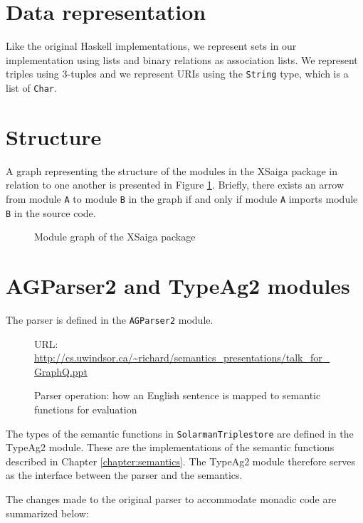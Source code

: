 \documentclass[../main.tex]{subfiles}
\begin{document}
\section{Data representation}

Like the original Haskell implementations, we represent sets in our implementation using lists and binary relations as association lists.  We represent triples using 3-tuples and we represent URIs using the \texttt{String} type, which is a list of \texttt{Char}.

\section{Structure}

A graph representing the structure of the modules in the XSaiga package in relation to one another is presented in Figure \ref{fig:modulegraph}.  Briefly, there exists an arrow from module \texttt{A} to module \texttt{B} in the graph if and only if module \texttt{A} imports module \texttt{B} in the source code.

\begin{figure}[h]
	\centering
	\caption{Module graph of the XSaiga package}
	\label{fig:modulegraph}
\end{figure}


\section{AGParser2 and TypeAg2 modules}
\label{section:nonrefparserimpl}

The parser is defined in the \texttt{AGParser2} module.

\begin{figure}[h]
	\centering
	{\scriptsize URL: \url{http://cs.uwindsor.ca/~richard/semantics_presentations/talk_for_GraphQ.ppt}}
	\caption{Parser operation: how an English sentence is mapped to semantic functions for evaluation\cite{frost2014demonstration}}
\end{figure}

The types of the semantic functions in \texttt{SolarmanTriplestore} are defined in the TypeAg2 module.
These are the implementations of the semantic functions described in Chapter \ref{chapter:semantics}.
The TypeAg2 module therefore serves as the interface between the parser and the semantics.

The changes made to the original parser to accommodate monadic code are summarized below:
\end{document}
